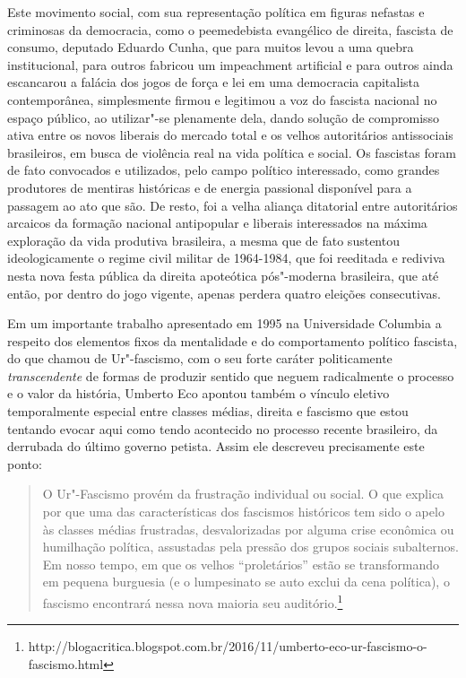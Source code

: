 Este movimento social, com sua representação política em figuras
nefastas e criminosas da democracia, como o peemedebista evangélico de
direita, fascista de consumo, deputado Eduardo Cunha, que para muitos
levou a uma quebra institucional, para outros fabricou um impeachment
artificial e para outros ainda escancarou a falácia dos jogos de força e
lei em uma democracia capitalista contemporânea, simplesmente firmou e
legitimou a voz do fascista nacional no espaço público, ao utilizar"-se
plenamente dela, dando solução de compromisso ativa entre os novos
liberais do mercado total e os velhos autoritários antissociais
brasileiros, em busca de violência real na vida política e social. Os
fascistas foram de fato convocados e utilizados, pelo campo político
interessado, como grandes produtores de mentiras históricas e de energia
passional disponível para a passagem ao ato que são. De resto, foi a
velha aliança ditatorial entre autoritários arcaicos da formação
nacional antipopular e liberais interessados na máxima exploração da
vida produtiva brasileira, a mesma que de fato sustentou ideologicamente
o regime civil militar de 1964-1984, que foi reeditada e rediviva nesta
nova festa pública da direita apoteótica pós"-moderna brasileira, que até
então, por dentro do jogo vigente, apenas perdera quatro eleições
consecutivas.

Em um importante trabalho apresentado em 1995 na Universidade Columbia a
respeito dos elementos fixos da mentalidade e do comportamento político
fascista, do que chamou de Ur"-fascismo, com o seu forte caráter
politicamente \emph{transcendente} de formas de produzir sentido que
neguem radicalmente o processo e o valor da história, Umberto Eco
apontou também o vínculo eletivo temporalmente especial entre classes
médias, direita e fascismo que estou tentando evocar aqui como tendo
acontecido no processo recente brasileiro, da derrubada do último
governo petista. Assim ele descreveu precisamente este ponto:

\begin{quote}
O Ur"-Fascismo provém da frustração individual ou social. O que explica
por que uma das características dos fascismos históricos tem sido o
apelo às classes médias frustradas, desvalorizadas por alguma crise
econômica ou humilhação política, assustadas pela pressão dos grupos
sociais subalternos. Em nosso tempo, em que os velhos ``proletários''
estão se transformando em pequena burguesia (e o lumpesinato se auto
exclui da cena política), o fascismo encontrará nessa nova maioria seu
auditório.\footnote{http://blogacritica.blogspot.com.br/2016/11/umberto-eco-ur-fascismo-o-fascismo.html}
\end{quote}

